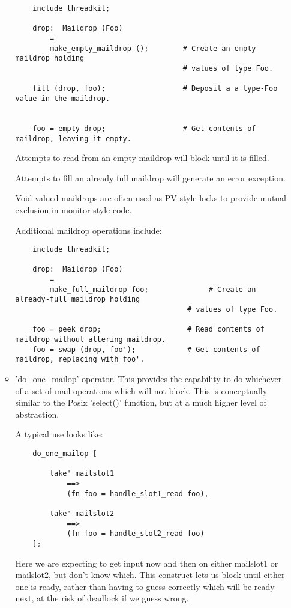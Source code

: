 \begin{itemize}
\begin{itemize}
\begin{verbatim}
    include threadkit;

    drop:  Maildrop (Foo)
        =
        make_empty_maildrop ();        # Create an empty maildrop holding
                                       # values of type Foo.

    fill (drop, foo);                  # Deposit a a type-Foo value in the maildrop.


    foo = empty drop;                  # Get contents of maildrop, leaving it empty.
\end{verbatim}

Attempts to read from an empty maildrop will 
block until it is filled.

Attempts to fill an already full maildrop 
will generate an error exception.

Void-valued maildrops are often used as 
PV-style locks to provide mutual exclusion 
in monitor-style code.

Additional maildrop operations include:

\begin{verbatim}
    include threadkit;

    drop:  Maildrop (Foo)
        =
        make_full_maildrop foo;              # Create an already-full maildrop holding
                                        # values of type Foo.

    foo = peek drop;                    # Read contents of maildrop without altering maildrop.
    foo = swap (drop, foo');            # Get contents of maildrop, replacing with foo'.
\end{verbatim}

\item 
'do\_one\_mailop' operator.  This provides the 
capability to do whichever of a set of 
mail operations which will not block. 
This is conceptually similar to the Posix 
'select()' function, but at a much higher 
level of abstraction.

A typical use looks like:

\begin{verbatim}
    do_one_mailop [

        take' mailslot1
            ==>
            (fn foo = handle_slot1_read foo),

        take' mailslot2
            ==>
            (fn foo = handle_slot2_read foo)
    ];
\end{verbatim}

Here we are expecting to get input now and 
then on either mailslot1 or mailslot2, but 
don't know which.  This construct lets us 
block until either one is ready, rather than 
having to guess correctly which will be ready 
next, at the risk of deadlock if we guess wrong. 


\end{itemize}
\end{itemize}
